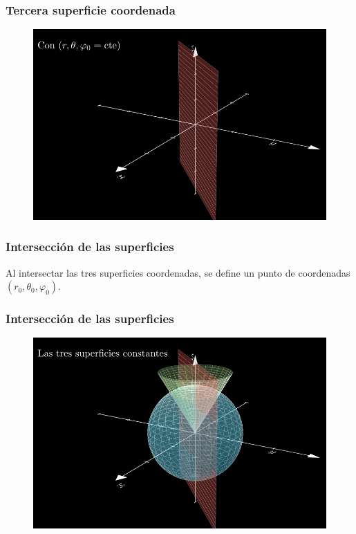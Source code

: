\documentclass[12pt]{beamer}
\begin{document}
{ %
\begin{frame}
\frametitle{Tercera superficie coordenada}
\begin{figure}
   \centering
   \includegraphics[width=0.95\linewidth]{Imagenes/superficies_esfericas_03.png}
   \label{fig:superficies_esfericas_03}
\end{figure}
\end{frame}
}
\begin{frame}
\frametitle{Intersección de las superficies}
Al intersectar las tres superficies coordenadas, se define un punto de coordenadas $(r_{0}, \theta_{0}, \varphi_{0})$.
\end{frame}
{ %
\begin{frame}
\frametitle{Intersección de las superficies}
\begin{figure}
   \centering
   \includegraphics[width=0.95\linewidth]{Imagenes/superficies_esfericas_04.png}
   \caption{}
   \label{fig:superficies_esfericas_04}
\end{figure}
\end{frame}
}
\end{document}
